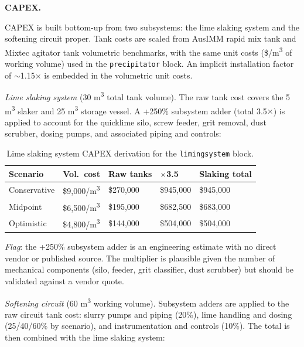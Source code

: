 \documentclass{article}
\renewcommand\_{\textunderscore\allowbreak}
\begin{document}
\medskip
\noindent\textbf{CAPEX.}\quad

CAPEX is built bottom-up from two subsystems: the lime slaking system and the softening circuit proper. Tank costs are scaled from AusIMM rapid mix tank and Mixtec agitator tank volumetric benchmarks, with the same unit costs (\$/\si{m^3} of working volume) used in the \texttt{precipitator} block. An implicit installation factor of $\sim$1.15$\times$ is embedded in the volumetric unit costs.

\textit{Lime slaking system} (30 \si{m^3} total tank volume). The raw tank cost covers the 5 \si{m^3} slaker and 25 \si{m^3} storage vessel. A +250\% subsystem adder (total 3.5$\times$) is applied to account for the quicklime silo, screw feeder, grit removal, dust scrubber, dosing pumps, and associated piping and controls:

\begin{table}[h!]
\caption{Lime slaking system CAPEX derivation for the \texttt{liming\_system} block.}
\centering
\begin{tabular}{>{\raggedright\arraybackslash}p{2.5cm}
				>{\raggedright\arraybackslash}p{2.8cm}
				>{\raggedright\arraybackslash}p{2.5cm}
				>{\raggedright\arraybackslash}p{2cm}
				>{\raggedright\arraybackslash}p{3cm}}
\toprule
\textbf{Scenario} & \textbf{Vol.\ cost} & \textbf{Raw tanks} & \textbf{$\times$3.5} & \textbf{Slaking total} \\
\midrule
Conservative & \$9,000/\si{m^3} & \$270,000 & \$945,000 & \$945,000 \\
Midpoint     & \$6,500/\si{m^3} & \$195,000 & \$682,500 & \$683,000 \\
Optimistic   & \$4,800/\si{m^3} & \$144,000 & \$504,000 & \$504,000 \\
\bottomrule
\end{tabular}
\end{table}

\noindent\textit{Flag}: the +250\% subsystem adder is an engineering estimate with no direct vendor or published source. The multiplier is plausible given the number of mechanical components (silo, feeder, grit classifier, dust scrubber) but should be validated against a vendor quote.

\textit{Softening circuit} (60 \si{m^3} working volume). Subsystem adders are applied to the raw circuit tank cost: slurry pumps and piping (20\%), lime handling and dosing (25/40/60\% by scenario), and instrumentation and controls (10\%). The total is then combined with the lime slaking system:
\end{document}
